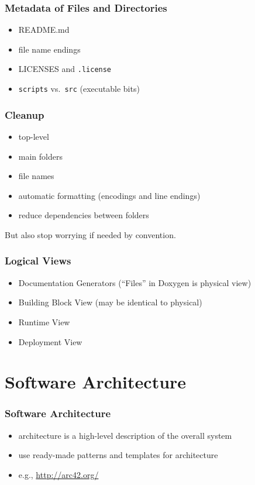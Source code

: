 \begin{frame}
	\frametitle{Metadata of Files and Directories}

	\begin{itemize}[<+-| alert@+>]
	\item README.md
	\item file name endings
	\item LICENSES and \texttt{.license}
	\item \texttt{scripts} vs.\ \texttt{src} (executable bits)
	\end{itemize}
\end{frame}

\begin{frame}
	\frametitle{Cleanup}

	\begin{itemize}[<+-| alert@+>]
	\item top-level
	\item main folders
	\item file names
	\item automatic formatting (encodings and line endings)
	\item reduce dependencies between folders
	\end{itemize}

	\vspace{1cm}

	But also stop worrying if needed by convention.
\end{frame}

\begin{frame}
	\frametitle{Logical Views}

	\begin{itemize}[<+-| alert@+>]
	\item Documentation Generators (``Files'' in Doxygen is physical view)
	\item Building Block View (may be identical to physical)
	\item Runtime View
	\item Deployment View
	\end{itemize}
\end{frame}

\section{Software Architecture}

\begin{frame}
	\frametitle{Software Architecture}
	\begin{itemize}[<+-| alert@+>]
	\item architecture is a high-level description of the overall system
	\item use ready-made patterns and templates for architecture
	\item e.g., \url{http://arc42.org/}
	\end{itemize}
\end{frame}

